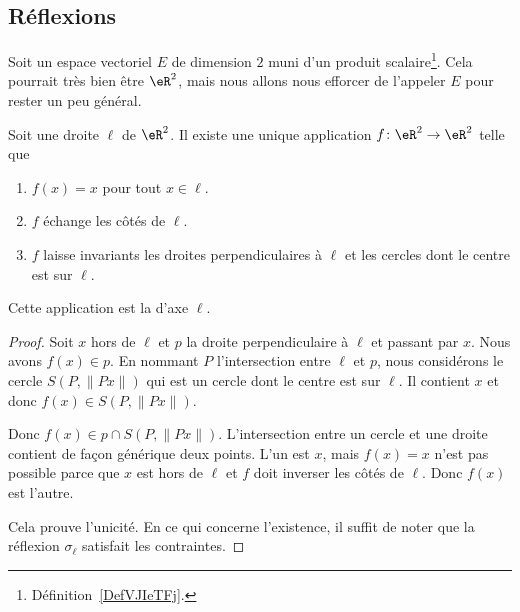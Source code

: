 \subsection{Réflexions}

Soit un espace vectoriel \( E\) de dimension \( 2\) muni d'un produit scalaire\footnote{Définition~\ref{DefVJIeTFj}.}. Cela pourrait très bien être \( \eR^2\), mais nous allons nous efforcer de l'appeler \( E\) pour rester un peu général.

\begin{lemmaDef}        \label{DEFooLJKDooUaamen}
	Soit une droite \( \ell\) de \( \eR^2\). Il existe une unique application \( f\colon \eR^2\to \eR^2\) telle que
	\begin{enumerate}
		\item
		      \( f(x)=x\) pour tout \( x\in \ell\).
		\item
		      \( f\) échange les côtés de \( \ell\).
		\item
		      \( f\) laisse invariants les droites perpendiculaires à \( \ell\) et les cercles dont le centre est sur \( \ell\).
	\end{enumerate}
	Cette application est la  d'axe \( \ell\).
\end{lemmaDef}

\begin{proof}
	Soit \( x\) hors de \( \ell\) et \( p\) la droite perpendiculaire à \( \ell\) et passant par \( x\). Nous avons \( f(x)\in p\). En nommant \( P\) l'intersection entre \( \ell\) et \( p\), nous considérons le cercle \( S(P,\| Px \|)\) qui est un cercle dont le centre est sur \( \ell\). Il contient \( x\) et donc \( f(x)\in S(P,\| Px \|)\).

	Donc \( f(x)\in p\cap S(P,\| Px \|)\). L'intersection entre un cercle et une droite contient de façon générique deux points. L'un est \( x\), mais \( f(x)=x\) n'est pas possible parce que \( x\) est hors de \( \ell\) et \( f\) doit inverser les côtés de \( \ell\). Donc \( f(x)\) est l'autre.

	Cela prouve l'unicité. En ce qui concerne l'existence, il suffit de noter que la réflexion \( \sigma_{\ell}\) satisfait les contraintes.
\end{proof}

